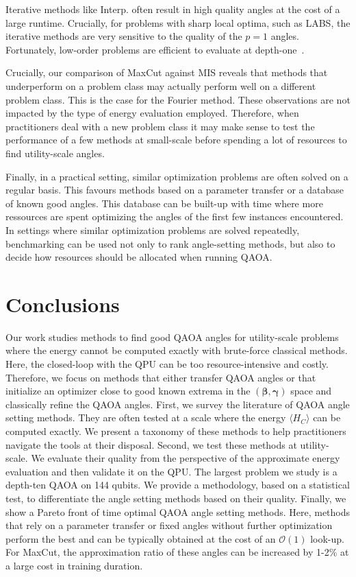\documentclass[twocolumn,
english,
aps,
pra,
10pt,
longbibliography,
superscriptaddress,
amsmath,
amssymb,
floatfix
]{revtex4-2}
\begin{document}
{Iterative methods like Interp. often result in high quality angles at the cost of a large runtime.
Crucially, for problems with sharp local optima, such as LABS, the iterative methods are very sensitive to the quality of the $p=1$ angles.
Fortunately, low-order problems are efficient to evaluate at depth-one~\cite{Egger2021warmstartingquantum}.

Crucially, our comparison of MaxCut against MIS reveals that methods that underperform on a problem class may actually perform well on a different problem class.
This is the case for the Fourier method.
These observations are not impacted by the type of energy evaluation employed.
Therefore, when practitioners deal with a new problem class it may make sense to test the performance of a few methods at small-scale before spending a lot of resources to find utility-scale angles.

Finally, in a practical setting, similar optimization problems are often solved on a regular basis.
This favours methods based on a parameter transfer or a database of known good angles.
This database can be built-up with time where more ressources are spent optimizing the angles of the first few instances encountered.
In settings where similar optimization problems are solved repeatedly, benchmarking can be used not only to rank angle-setting methods, but also to decide how resources should be allocated when running QAOA. 


\section{Conclusions \label{sec:conc}}

Our work studies methods to find good QAOA angles for utility-scale problems where the energy cannot be computed exactly with brute-force classical methods.
Here, the closed-loop with the QPU can be too resource-intensive and costly.
Therefore, we focus on methods that either transfer QAOA angles or that initialize an optimizer close to good known extrema in the $(\boldsymbol{\beta}, \boldsymbol{\gamma})$ space and classically refine the QAOA angles.
First, we survey the literature of QAOA angle setting methods. 
They are often tested at a scale where the energy $\langle H_C\rangle$ can be computed exactly.
We present a taxonomy of these methods to help practitioners navigate the tools at their disposal.
Second, we test these methods at utility-scale.
We evaluate their quality from the perspective of the approximate energy evaluation and then validate it on the QPU.
The largest problem we study is a depth-ten QAOA on 144 qubits.
We provide a methodology, based on a statistical test, to differentiate the angle setting methods based on their quality.
Finally, we show a Pareto front of time optimal QAOA angle setting methods.
Here, methods that rely on a parameter transfer or fixed angles without further optimization perform the best and can be typically obtained at the cost of an $\mathcal{O}(1)$ look-up.
For MaxCut, the approximation ratio of these angles can be increased by 1-2\% at a large cost in training duration.

}
\end{document}
